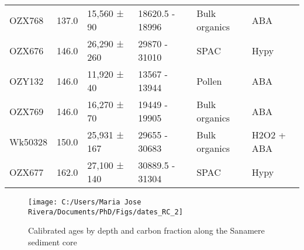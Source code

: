 \documentclass[
  12pt,
]{book}
\begin{document}
\begin{table}
{\begin{tabular}[t]{lrllll}
OZX768 & 137.0 & 15,560 ± 90 & 18620.5 - 18996 & Bulk organics & ABA\\
OZX676 & 146.0 & 26,290 ± 260 & 29870 - 31010 & SPAC & Hypy\\
OZY132 & 146.0 & 11,920 ± 40 & 13567 - 13944 & Pollen & ABA\\
OZX769 & 146.0 & 16,270 ± 70 & 19449 - 19905 & Bulk organics & ABA\\
Wk50328 & 150.0 & 25,931 ± 167 & 29655 - 30683 & Bulk organics & H2O2 + ABA\\
OZX677 & 162.0 & 27,100 ± 140 & 30889.5 - 31304 & SPAC & Hypy\\
\bottomrule
\end{tabular}}
\end{table}



\begin{table}

\caption{\label{tab:tb-four}Offset, minimum and maximum calibrated ages by depth}
\centering
{}
\end{table}



\begin{figure}

{\centering \texttt{[image: C:/Users/Maria Jose Rivera/Documents/PhD/Figs/dates\_RC\_2]} 

}

\caption{Calibrated ages by depth and carbon fraction along the Sanamere sediment core}\label{fig:radiocarbon-gr2}
\end{figure}
\end{document}
